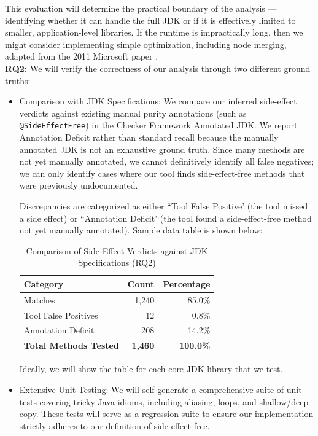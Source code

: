 This evaluation will determine the practical boundary of the analysis --- identifying whether it can handle the full JDK or if it is effectively limited to smaller, application-level libraries. If the runtime is impractically long, then we might consider implementing simple optimization, including node merging, adapted from the 2011 Microsoft paper \cite{MadhavanPurity2011}.
\\

\textbf{RQ2:} We will verify the correctness of our analysis through two different ground truths:

\begin{itemize}
    
\item Comparison with JDK Specifications: We compare our inferred side-effect verdicts against existing manual purity annotations (such as \texttt{@SideEffectFree}) in the Checker Framework Annotated JDK. We report Annotation Deficit rather than standard recall because the manually annotated JDK is not an exhaustive ground truth. Since many methods are not yet manually annotated, we cannot definitively identify all false negatives; we can only identify cases where our tool finds side-effect-free methods that were previously undocumented. 

Discrepancies are categorized as either ``Tool False Positive' (the tool missed a side effect) or ``Annotation Deficit' (the tool found a side-effect-free method not yet manually annotated). Sample data table is shown below:

\begin{table}[h]
\centering
\caption{Comparison of Side-Effect Verdicts against JDK Specifications (RQ2)}
\label{tab:purity-results}
\begin{tabular}{lrr}
\hline
\textbf{Category} & \textbf{Count} & \textbf{Percentage} \\ \hline
Matches & 1,240 & 85.0\% \\
Tool False Positives & 12 & 0.8\% \\
Annotation Deficit & 208 & 14.2\% \\ \hline
\textbf{Total Methods Tested} & \textbf{1,460} & \textbf{100.0\%} \\ \hline
\end{tabular}
\end{table}
Ideally, we will show the table for each core JDK library that we test. 

\item Extensive Unit Testing: We will self-generate a comprehensive suite of unit tests covering tricky Java idioms, including aliasing, loops, and shallow/deep copy. These tests will serve as a regression suite to ensure our implementation strictly adheres to our definition of side-effect-free.
\end{itemize}

